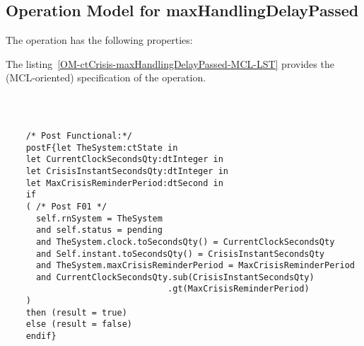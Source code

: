\subsection{Operation Model for maxHandlingDelayPassed}

\label{OM-maxHandlingDelayPassed}


The  operation has the following properties:

	\begin{operationmodel}



		


	\end{operationmodel}



	\vspace{1cm}
	The listing~\ref{OM-ctCrisis-maxHandlingDelayPassed-MCL-LST} provides the \msrmessir (MCL-oriented) specification of the operation.
	
	\scriptsize
	\vspace{0.5cm}
	\begin{lstlisting}[style=MessirStyle,firstnumber=auto,captionpos=b,caption={\msrmessir (MCL-oriented) specification of the operation \emph{maxHandlingDelayPassed}.},label=OM-ctCrisis-maxHandlingDelayPassed-MCL-LST]

	
	
	/* Post Functional:*/ 
	postF{let TheSystem:ctState in
	let CurrentClockSecondsQty:dtInteger in
	let CrisisInstantSecondsQty:dtInteger in
	let MaxCrisisReminderPeriod:dtSecond in
	if 
	( /* Post F01 */
	  self.rnSystem = TheSystem
	  and self.status = pending
	  and TheSystem.clock.toSecondsQty() = CurrentClockSecondsQty
	  and Self.instant.toSecondsQty() = CrisisInstantSecondsQty
	  and TheSystem.maxCrisisReminderPeriod = MaxCrisisReminderPeriod
	  and CurrentClockSecondsQty.sub(CrisisInstantSecondsQty)
	                            .gt(MaxCrisisReminderPeriod)
	)
	then (result = true)
	else (result = false)
	endif}
	
	
	\end{lstlisting}
	\normalsize 
	
	
	
	





